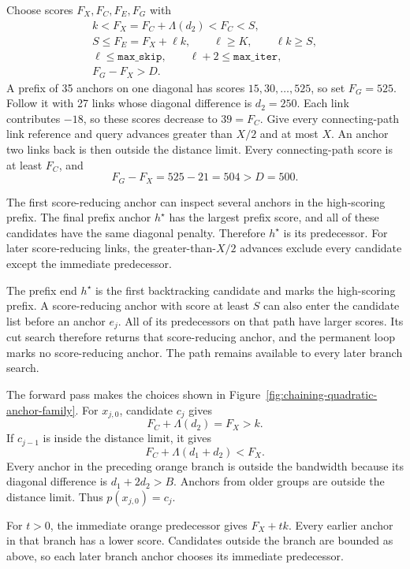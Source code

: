 Choose scores \(F_X,F_C,F_E,F_G\) with
\begin{equation}
\begin{gathered}
  k<F_X=F_C+\Lambda(d_2)<F_C<S,\\
  S\leq F_E=F_X+\ell k,\qquad
  \ell\geq K,\qquad \ell k\geq S,\\
  \ell\leq\texttt{max\_skip},\qquad
  \ell+2\leq\texttt{max\_iter},\\
  F_G-F_X>D.
\end{gathered}
\label{eq:chaining-quadratic-score-conditions}
\end{equation}
A prefix of 35 anchors on one diagonal has scores
\(15,30,\ldots,525\), so set \(F_G=525\). Follow it with 27 links whose
diagonal difference is \(d_2=250\). Each link contributes \(-18\), so these
scores decrease to \(39=F_C\). Give every connecting-path link reference and
query advances greater than \(X/2\) and at most \(X\). An anchor two links back
is then outside the distance limit. Every connecting-path score is at least
\(F_C\), and
\[
  F_G-F_X=525-21=504>D=500.
\]

The first score-reducing anchor can inspect several anchors in the high-scoring
prefix. The final prefix anchor \(h^\star\) has the largest prefix score, and
all of these candidates have the same diagonal penalty. Therefore
\(h^\star\) is its predecessor. For later score-reducing links, the
greater-than-\(X/2\) advances exclude every candidate except the immediate
predecessor.

The prefix end \(h^\star\) is the first backtracking candidate and marks the
high-scoring prefix. A score-reducing anchor with score at least \(S\) can also
enter the candidate list before an anchor \(e_j\). All of its predecessors on
that path have larger scores. Its cut search therefore returns that
score-reducing anchor, and
the permanent loop marks no score-reducing anchor. The path remains available
to every later branch search.

The forward pass makes the choices shown in
Figure~\ref{fig:chaining-quadratic-anchor-family}. For \(x_{j,0}\), candidate
\(c_j\) gives
\[
  F_C+\Lambda(d_2)=F_X>k.
\]
If \(c_{j-1}\) is inside the distance limit, it gives
\[
  F_C+\Lambda(d_1+d_2)<F_X.
\]
Every anchor in the preceding orange branch is outside the bandwidth because
its diagonal difference is \(d_1+2d_2>B\). Anchors from older groups are
outside the distance limit. Thus \(p(x_{j,0})=c_j\).

For \(t>0\), the immediate orange predecessor gives \(F_X+tk\). Every earlier
anchor in that branch has a lower score. Candidates outside the branch are
bounded as above, so each later branch anchor chooses its immediate
predecessor.

